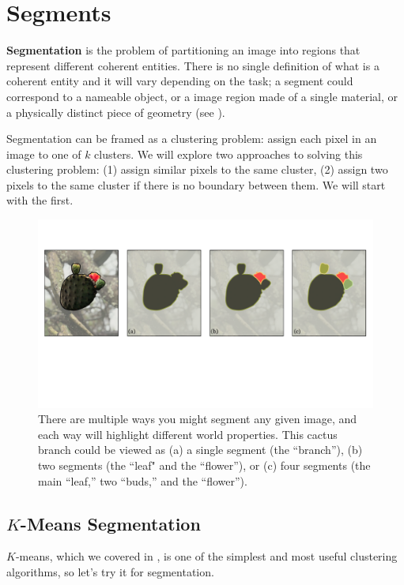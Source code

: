 \section{Segments}

\textbf{Segmentation} is the problem of partitioning an image into regions that represent different coherent entities. There is no single definition of what is a coherent entity and it will vary depending on the task; a segment could correspond to a nameable object, or a image region made of a single material, or a physically distinct piece of geometry (see \fig{\ref{fig:perceptual_organization:ambiguous_segmentation_example}}).

Segmentation can be framed as a clustering problem: assign each pixel in an image to one of $k$ clusters. We will explore two approaches to solving this clustering problem: (1) assign similar pixels to the same cluster, (2) assign two pixels to the same cluster if there is no boundary between them. We will start with the first.

\begin{figure}[h!]
    \centerline{
        \includegraphics[width=1.0\linewidth]{./figures/perceptual_organization/ambiguous_segmentation_example.pdf}
    }
    \caption{There are multiple ways you might segment any given image, and each way will highlight different world properties. This cactus branch could be viewed as (a) a single segment (the ``branch''), (b) two segments (the ``leaf" and the ``flower''), or (c) four segments (the main ``leaf,'' two ``buds,'' and the ``flower'').}
    \label{fig:perceptual_organization:ambiguous_segmentation_example}
\end{figure}
\vspace{-0.4cm}

\subsection{$K$-Means Segmentation}
$K$-means, which we covered in \chap{\ref{chapter:representation_learning}}, is one of the simplest and most useful clustering algorithms, so let's try it for segmentation.

